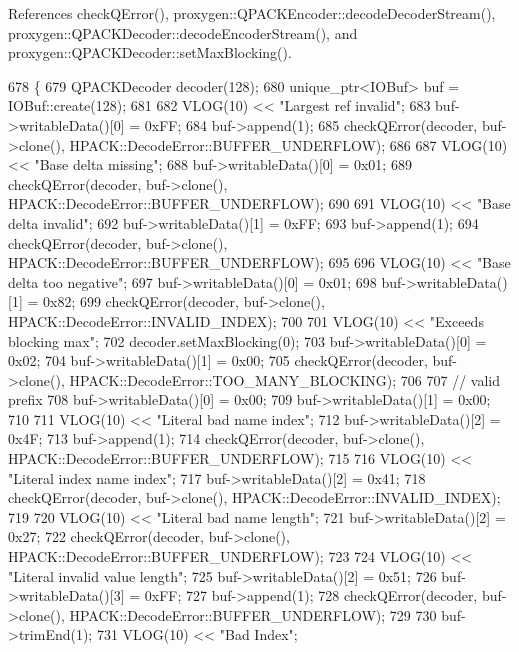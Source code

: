 References check\+Q\+Error(), proxygen\+::\+Q\+P\+A\+C\+K\+Encoder\+::decode\+Decoder\+Stream(), proxygen\+::\+Q\+P\+A\+C\+K\+Decoder\+::decode\+Encoder\+Stream(), and proxygen\+::\+Q\+P\+A\+C\+K\+Decoder\+::set\+Max\+Blocking().


\begin{DoxyCode}
678                                       \{
679   QPACKDecoder decoder(128);
680   unique\_ptr<IOBuf> buf = IOBuf::create(128);
681 
682   VLOG(10) << \textcolor{stringliteral}{"Largest ref invalid"};
683   buf->writableData()[0] = 0xFF;
684   buf->append(1);
685   checkQError(decoder, buf->clone(), HPACK::DecodeError::BUFFER\_UNDERFLOW);
686 
687   VLOG(10) << \textcolor{stringliteral}{"Base delta missing"};
688   buf->writableData()[0] = 0x01;
689   checkQError(decoder, buf->clone(), HPACK::DecodeError::BUFFER\_UNDERFLOW);
690 
691   VLOG(10) << \textcolor{stringliteral}{"Base delta invalid"};
692   buf->writableData()[1] = 0xFF;
693   buf->append(1);
694   checkQError(decoder, buf->clone(), HPACK::DecodeError::BUFFER\_UNDERFLOW);
695 
696   VLOG(10) << \textcolor{stringliteral}{"Base delta too negative"};
697   buf->writableData()[0] = 0x01;
698   buf->writableData()[1] = 0x82;
699   checkQError(decoder, buf->clone(), HPACK::DecodeError::INVALID\_INDEX);
700 
701   VLOG(10) << \textcolor{stringliteral}{"Exceeds blocking max"};
702   decoder.setMaxBlocking(0);
703   buf->writableData()[0] = 0x02;
704   buf->writableData()[1] = 0x00;
705   checkQError(decoder, buf->clone(), HPACK::DecodeError::TOO\_MANY\_BLOCKING);
706 
707   \textcolor{comment}{// valid prefix}
708   buf->writableData()[0] = 0x00;
709   buf->writableData()[1] = 0x00;
710 
711   VLOG(10) << \textcolor{stringliteral}{"Literal bad name index"};
712   buf->writableData()[2] = 0x4F;
713   buf->append(1);
714   checkQError(decoder, buf->clone(), HPACK::DecodeError::BUFFER\_UNDERFLOW);
715 
716   VLOG(10) << \textcolor{stringliteral}{"Literal index name index"};
717   buf->writableData()[2] = 0x41;
718   checkQError(decoder, buf->clone(), HPACK::DecodeError::INVALID\_INDEX);
719 
720   VLOG(10) << \textcolor{stringliteral}{"Literal bad name length"};
721   buf->writableData()[2] = 0x27;
722   checkQError(decoder, buf->clone(), HPACK::DecodeError::BUFFER\_UNDERFLOW);
723 
724   VLOG(10) << \textcolor{stringliteral}{"Literal invalid value length"};
725   buf->writableData()[2] = 0x51;
726   buf->writableData()[3] = 0xFF;
727   buf->append(1);
728   checkQError(decoder, buf->clone(), HPACK::DecodeError::BUFFER\_UNDERFLOW);
729 
730   buf->trimEnd(1);
731   VLOG(10) << \textcolor{stringliteral}{"Bad Index"};

\end{DoxyCode}
